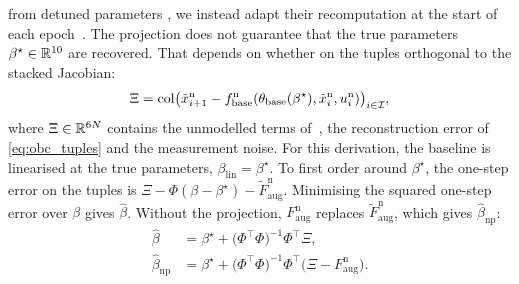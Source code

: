  from detuned parameters ,
we instead adapt their recomputation 
at the start of each epoch~\cite[Remark~2]{gyorok2025l4dc}.
%
%
The projection does not guarantee that the true parameters $\beta^\star\in\mathbb{R}^{10}$ are recovered.
That depends on whether  on the tuples 
orthogonal to the stacked Jacobian:
\begin{equation}
 \Xi
 =\operatorname{col}\bigl(\tilde x^{\mathrm n}_{i+1}-f^{\mathrm n}_{\mathrm{base}}(\theta_{\mathrm{base}}(\beta^\star),\tilde x^{\mathrm n}_i,u^{\mathrm n}_i)\bigr)_{i\in\mathcal I},
\label{eq:obc_eps}
\end{equation}
where $\Xi\in\mathbb{R}^{6N}$ contains the unmodelled terms
of~\cite[Eqs.~(14), (15)]{gyorok2026obc},
the reconstruction error of \eqref{eq:obc_tuples}
and the measurement noise.
For this derivation, the baseline is linearised at the true parameters,
$\beta_{\mathrm{lin}}=\beta^\star$.
To first order around $\beta^\star$, the one-step error on the tuples is
$\Xi-\Phi(\beta-\beta^\star)-\tilde F^{\mathrm n}_{\mathrm{aug}}$.
Minimising the squared one-step error over $\beta$ gives $\hat\beta$.
Without the projection, $F^{\mathrm n}_{\mathrm{aug}}$ replaces
$\tilde F^{\mathrm n}_{\mathrm{aug}}$, which gives $\hat\beta_{\mathrm{np}}$:
\begin{equation}
\begin{aligned}
 \hat\beta&=\beta^\star+\bigl(\Phi^\top\Phi\bigr)^{-1}\Phi^\top\Xi,\\
 \hat\beta_{\mathrm{np}}&=\beta^\star+\bigl(\Phi^\top\Phi\bigr)^{-1}\Phi^\top\bigl(\Xi-F^{\mathrm n}_{\mathrm{aug}}\bigr).
\end{aligned}
\label{eq:obc_recovery}
\end{equation}

